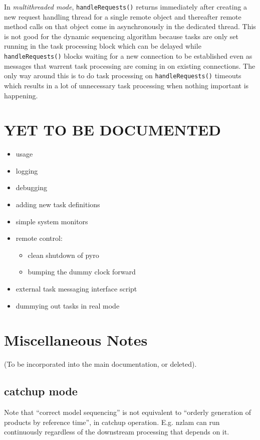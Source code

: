\documentclass[11pt,a4paper]{report}
\begin{document}
In {\em multithreaded mode}, \verb#handleRequests()# returns immediately
after creating a new request handling thread for a single remote object
and thereafter remote method calls on that object come in asynchronously
in the dedicated thread. This is not good for the dynamic sequencing
algorithm because tasks are only set running in the task processing
block which can be delayed while \verb#handleRequests()# blocks waiting
for a new connection to be established even as messages that warrent
task processing are coming in on existing connections. The only way
around this is to do task processing on \verb#handleRequests()# timeouts
which results in a lot of unnecessary task processing when nothing
important is happening.


\chapter{YET TO BE DOCUMENTED}

\begin{itemize}
 \item usage
 \item logging
 \item debugging
 \item adding new task definitions
 \item simple system monitors
 \item remote control: 
    \begin{itemize}
    \item clean shutdown of pyro
    \item bumping the dummy clock forward
    \end{itemize}
 \item external task messaging interface script
 \item dummying out tasks in real mode
\end{itemize}

\chapter{Miscellaneous Notes}

(To be incorporated into the main documentation, or deleted).

\section{catchup mode}

Note that ``correct model sequencing'' is not equivalent to ``orderly
generation of products by reference time'', in catchup operation.  E.g.
nzlam can run continuously regardless of the downstream processing that
depends on it.
\end{document}
